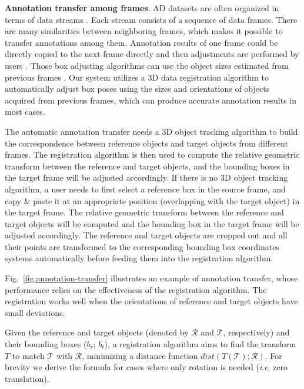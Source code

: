 \documentclass[letterpaper, 10 pt, conference]{ieeeconf}  %
\begin{document}
\textbf{Annotation transfer among frames}. 
AD datasets are often organized in terms of data streams \cite{Caesar2019nuScenesAM,Patil2019TheHD,lyft2019}. Each stream consists of a sequence of data frames. 
There are many similarities between neighboring frames, which makes it possible to transfer annotations among them. 
Annotation results of one frame could be directly copied to the next frame directly and then adjustments are performed by users \cite{Zimmer20193DBA}.
Those box adjusting algorithms can use the object sizes estimated from previous frames \cite{Wang2019LATTEAL}. 
Our system utilizes a 3D data registration algorithm \cite{Yang2016GoICPAG} to automatically adjust box poses using the sizes and orientations of objects acquired from previous frames,
which can produce accurate annotation results in most cases.

The automatic annotation transfer needs a 3D object tracking algorithm to build the correspondence between reference objects and target objects from different frames. 
The registration algorithm is then used to compute the relative geometric transform between the reference and target objects, 
and the bounding boxes in the target frame will be adjusted accordingly.
If there is no 3D object tracking algorithm, a user needs to first select a reference box in the source frame, and copy \& paste it at an appropriate position (overlapping with the target object) in the target frame. 
The relative geometric transform between the reference and target objects will be computed and the bounding box in the target frame will be adjusted accordingly.
The reference and target objects are cropped out and all their points are transformed to the corresponding bounding box coordinates systems automatically
before feeding them into the registration algorithm.

Fig.~\ref{fig:annotation-transfer} illustrates an example of annotation transfer, whose performance relies on the effectiveness of the registration algorithm. 
The registration works well when the orientations of reference and target objects have small deviations.

Given the reference and target objects (denoted by $\mathcal{R}$ and $\mathcal{T}$, respectively) and their bounding boxes ($b_r$; $b_t$), a registration algorithm aims to find the transform $T$ to match $\mathcal{T}$ with $\mathcal{R}$, minimizing a distance function $dist(T(\mathcal{T}); \mathcal{R} )$. For brevity we derive the formula for cases where only rotation is needed (\textit{i}.\textit{e}. zero translation).
\end{document}
